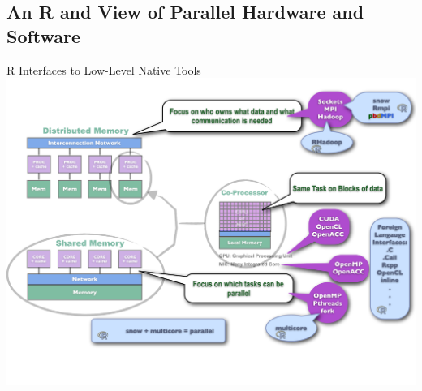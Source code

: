\subsection{An R and \protect\pbdR View of Parallel Hardware and Software}

\begin{frame}{R Interfaces to Low-Level Native Tools}
\includegraphics[width=1.30\textheight]
{../common/pics/hardware/ParallelHardware10.pdf}
\end{frame}

